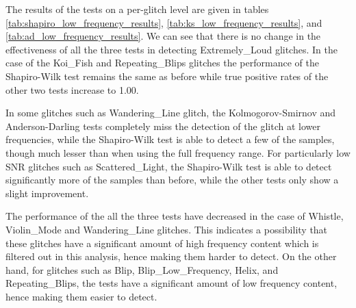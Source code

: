 \documentclass[12pt]{article}
\begin{document}
\noindent The results of the tests on a per-glitch level are given in tables \ref{tab:shapiro_low_frequency_results}, \ref{tab:ks_low_frequency_results}, and \ref{tab:ad_low_frequency_results}. We can see that there is no change in the effectiveness of all the three tests in detecting Extremely\_Loud glitches. In the case of the Koi\_Fish and Repeating\_Blips glitches the performance of the Shapiro-Wilk test remains the same as before while true positive rates of the other two tests increase to 1.00.

\medskip
\noindent In some glitches such as Wandering\_Line glitch, the Kolmogorov-Smirnov and Anderson-Darling tests completely miss the detection of the glitch at lower frequencies, while the Shapiro-Wilk test is able to detect a few of the samples, though much lesser than when using the full frequency range. For particularly low SNR glitches such as Scattered\_Light, the Shapiro-Wilk test is able to detect significantly more of the samples than before, while the other tests only show a slight improvement.

\medskip
\noindent The performance of the all the three tests have decreased in the case of Whistle, Violin\_Mode and Wandering\_Line glitches. This indicates a possibility that these glitches have a significant amount of high frequency content which is filtered out in this analysis, hence making them harder to detect. On the other hand, for glitches such as Blip, Blip\_Low\_Frequency, Helix, and Repeating\_Blips, the tests have a significant amount of low frequency content, hence making them easier to detect.
\end{document}
